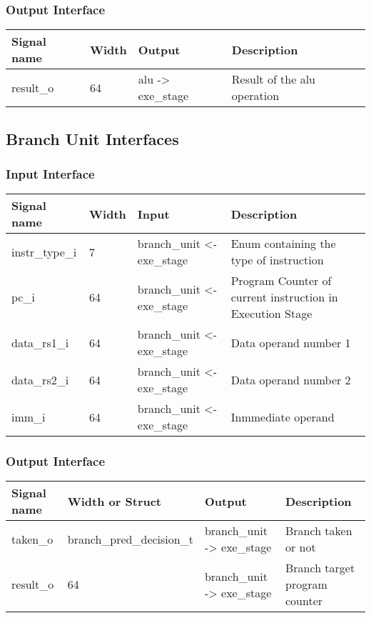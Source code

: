 \subsubsection{Output Interface}

\begin{table}[H]
\centering
\begin{tabular}{l|l|l|l}
\hline
\hline
Signal name & Width & Output & Description \\
\hline
\hline
result\_o & 64 & alu -> exe\_stage & Result of the alu operation\\
\hline
\hline
\end{tabular}
\end{table}



\subsection{Branch Unit Interfaces}

\subsubsection{Input Interface}

\begin{table}[H]
\centering
\begin{tabular}{l|l|l|p{7cm}}
\hline
\hline
Signal name & Width & Input & Description \\
\hline
\hline
instr\_type\_i & 7 & branch\_unit <- exe\_stage & Enum containing the type of instruction \\
\hline
pc\_i & 64 & branch\_unit <- exe\_stage & Program Counter of current instruction in Execution Stage \\
\hline
data\_rs1\_i & 64 & branch\_unit <- exe\_stage & Data operand number 1 \\
\hline
data\_rs2\_i & 64 & branch\_unit <- exe\_stage & Data operand number 2 \\
\hline
imm\_i & 64 & branch\_unit <- exe\_stage & Inmmediate operand \\
\hline
\hline
\end{tabular}
\end{table}

\subsubsection{Output Interface}

\begin{table}[H]
\centering
\begin{tabular}{l|l|l|p{5cm}}
\hline
\hline
Signal name & Width or Struct & Output & Description \\
\hline
\hline
taken\_o & branch\_pred\_decision\_t & branch\_unit -> exe\_stage & Branch taken or not\\
result\_o & 64 & branch\_unit -> exe\_stage & Branch target program counter\\
\hline
\hline
\end{tabular}
\end{table}